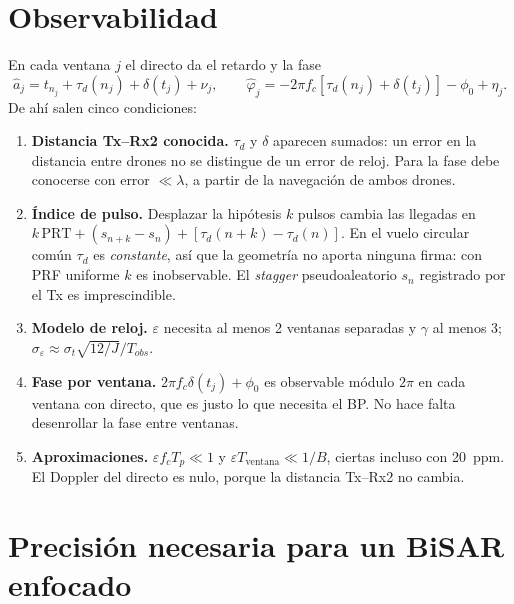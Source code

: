 \documentclass[11pt,a4paper]{article}
\begin{document}
\section{Observabilidad}
\label{sec:obs}

En cada ventana $j$ el directo da el retardo y la fase
\begin{equation}
\hat a_j=t_{n_j}+\tau_d(n_j)+\delta(t_j)+\nu_j,\qquad
\hat\varphi_j=-2\pi f_c[\tau_d(n_j)+\delta(t_j)]-\phi_0+\eta_j .
\end{equation}
De ahí salen cinco condiciones:
\begin{enumerate}
\item \textbf{Distancia Tx--Rx2 conocida.} $\tau_d$ y $\delta$ aparecen
  sumados: un error en la distancia entre drones no se distingue de un error
  de reloj. Para la fase debe conocerse con error $\ll\lambda$, a partir de
  la navegación de ambos drones.
\item \textbf{Índice de pulso.} Desplazar la hipótesis $k$ pulsos cambia las
  llegadas en $k\,\mathrm{PRT}+(s_{n+k}-s_n)+[\tau_d(n+k)-\tau_d(n)]$. En el
  vuelo circular común $\tau_d$ es \emph{constante}, así que la geometría no
  aporta ninguna firma: con PRF uniforme $k$ es inobservable. El
  \emph{stagger} pseudoaleatorio $s_n$ registrado por el Tx es
  imprescindible.
\item \textbf{Modelo de reloj.} $\varepsilon$ necesita al menos 2 ventanas
  separadas y $\gamma$ al menos 3;
  $\sigma_\varepsilon\approx\sigma_t\sqrt{12/J}/T_{obs}$.
\item \textbf{Fase por ventana.} $2\pi f_c\delta(t_j)+\phi_0$ es observable
  módulo $2\pi$ en cada ventana con directo, que es justo lo que necesita el
  BP. No hace falta desenrollar la fase entre ventanas.
\item \textbf{Aproximaciones.} $\varepsilon f_cT_p\ll1$ y
  $\varepsilon T_{\text{ventana}}\ll1/B$, ciertas incluso con 20~ppm. El
  Doppler del directo es nulo, porque la distancia Tx--Rx2 no cambia.
\end{enumerate}

\section{Precisión necesaria para un BiSAR enfocado}
\label{sec:tol}
\end{document}
